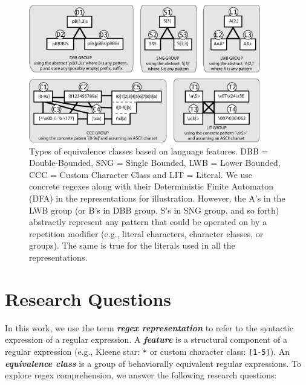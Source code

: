 \begin{figure}[tb]
\centering
\includegraphics[width=0.90\textwidth]{illustrations/refactoringTree.eps}
\vspace{-6pt}
\caption{Types of equivalence classes based on language features. DBB = Double-Bounded, SNG = Single Bounded, LWB = Lower Bounded, CCC = Custom Character Class and LIT = Literal. We use concrete regexes along with their Deterministic Finite Automaton (DFA) in the representations for illustration. However, the A's in the LWB group (or B's in DBB group, S's in SNG group, and so forth) abstractly represent any pattern that could be operated on by a repetition modifier (e.g., literal characters, character classes, or groups). The same is true for the literals used in all the representations. }
\vspace{-6pt}
\vspace{-6pt}
\label{fig:refactoringTree}
\end{figure}


\section{Research Questions}
\label{sec:study}

In this work, we use the term \textbf{\emph{regex representation}} to refer to the syntactic expression of a regular expression. A \textbf{\emph{feature}} is a structural component of a regular expression (e.g., Kleene star: \verb!*! or custom character class: \verb![1-5]!). An \textbf{\emph{equivalence class}} is a group of behaviorally equivalent regular expressions. 
To explore regex comprehension, we answer the following research questions: \\

